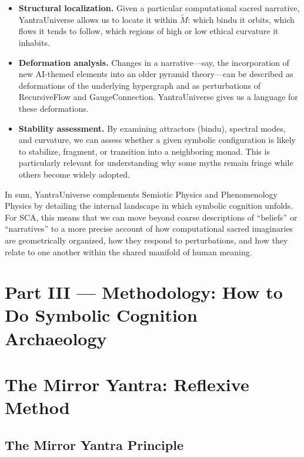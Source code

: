 \documentclass[12]{amsart}
\theoremstyle{plain}
\begin{document}
\begin{itemize}
  \item \textbf{Structural localization.} Given a particular computational sacred narrative, YantraUniverse allows us to locate it within $\tilde M$: which bindu it orbits, which flows it tends to follow, which regions of high or low ethical curvature it inhabits.
  \item \textbf{Deformation analysis.} Changes in a narrative—say, the incorporation of new AI-themed elements into an older pyramid theory—can be described as deformations of the underlying hypergraph and as perturbations of RecursiveFlow and GaugeConnection. YantraUniverse gives us a language for these deformations.
  \item \textbf{Stability assessment.} By examining attractors (bindu), spectral modes, and curvature, we can assess whether a given symbolic configuration is likely to stabilize, fragment, or transition into a neighboring monad. This is particularly relevant for understanding why some myths remain fringe while others become widely adopted.
\end{itemize}

In sum, YantraUniverse complements Semiotic Physics and Phenomenology Physics by detailing the internal landscape in which symbolic cognition unfolds. For SCA, this means that we can move beyond coarse descriptions of ``beliefs'' or ``narratives'' to a more precise account of how computational sacred imaginaries are geometrically organized, how they respond to perturbations, and how they relate to one another within the shared manifold of human meaning.


\section*{Part III — Methodology: How to Do Symbolic Cognition Archaeology}

\section{The Mirror Yantra: Reflexive Method}

\subsection{The Mirror Yantra Principle}
\end{document}
